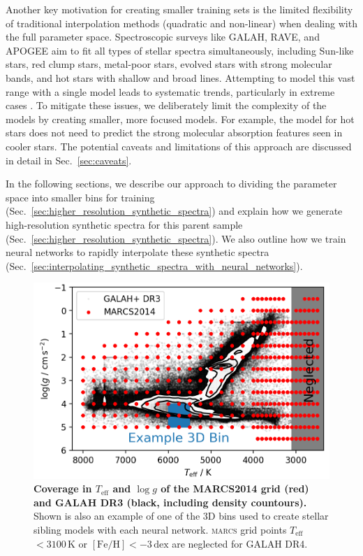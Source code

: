 \documentclass[
  journal=pasa,
  manuscript=research-paper, %
  year=2024,
  volume=37
]{cup-journal}
\newcommand{\Teff}{$T_\mathrm{eff}$\xspace}
\newcommand{\logg}{$\log g$\xspace}
\newcommand{\feh}{$\mathrm{[Fe/H]}$\xspace}
\newcommand{\marcs}{\textsc{marcs}\xspace}
\newcommand{\dex}{\,\mathrm{dex}}	%
\newcommand{\K}{\,\mathrm{K}}	%
\begin{document}
Another key motivation for creating smaller training sets is the limited flexibility of traditional interpolation methods (quadratic and non-linear) when dealing with the full parameter space. Spectroscopic surveys like GALAH, RAVE, and APOGEE aim to fit all types of stellar spectra simultaneously, including Sun-like stars, red clump stars, metal-poor stars, evolved stars with strong molecular bands, and hot stars with shallow and broad lines. Attempting to model this vast range with a single model leads to systematic trends, particularly in extreme cases \citep{Casey2016, Buder2018, Ting2019}. To mitigate these issues, we deliberately limit the complexity of the models by creating smaller, more focused models. For example, the model for hot stars does not need to predict the strong molecular absorption features seen in cooler stars. The potential caveats and limitations of this approach are discussed in detail in Sec.~\ref{sec:caveats}.

In the following sections, we describe our approach to dividing the parameter space into smaller bins for training (Sec.~\ref{sec:higher_resolution_synthetic_spectra}) and explain how we generate high-resolution synthetic spectra for this parent sample (Sec.~\ref{sec:higher_resolution_synthetic_spectra}). We also outline how we train neural networks to rapidly interpolate these synthetic spectra (Sec.~\ref{sec:interpolating_synthetic_spectra_with_neural_networks}).

\begin{figure}[ht]
 \centering
 \includegraphics[width=\textwidth]{figures/teff_logg_grid_coverage.png}
 \caption{\textbf{Coverage in \Teff and \logg of the MARCS2014 grid (red) and GALAH DR3 (black, including density countours).} Shown is also an example of one of the 3D bins used to create stellar sibling models with each neural network. \marcs grid points \Teff$ < 3100\K$ or \feh$<-3\dex$ are neglected for GALAH DR4.}
 \label{fig:teff_logg_grid_coverage}
\end{figure}
\end{document}
